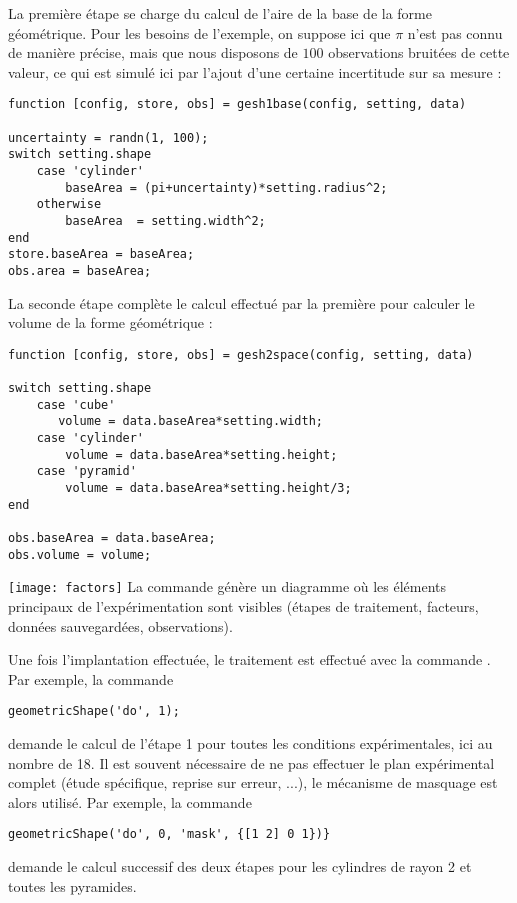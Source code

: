 La première étape se charge du calcul de l'aire de la base de la forme géométrique. Pour les besoins de l'exemple, on suppose ici que $\pi$ n'est pas connu de manière précise, mais que nous disposons de $100$ observations bruitées de cette valeur, ce qui est simulé ici par l'ajout d'une certaine incertitude sur sa mesure :
\begin{lstlisting}
function [config, store, obs] = gesh1base(config, setting, data)

uncertainty = randn(1, 100);
switch setting.shape
    case 'cylinder'
        baseArea = (pi+uncertainty)*setting.radius^2;
    otherwise
        baseArea  = setting.width^2;
end
store.baseArea = baseArea;
obs.area = baseArea;
\end{lstlisting}

La seconde étape complète le calcul effectué par la première pour calculer le volume de la forme géométrique :
\begin{lstlisting}
function [config, store, obs] = gesh2space(config, setting, data)

switch setting.shape
    case 'cube'
       volume = data.baseArea*setting.width;
    case 'cylinder'
        volume = data.baseArea*setting.height;
    case 'pyramid'
        volume = data.baseArea*setting.height/3;
end

obs.baseArea = data.baseArea;
obs.volume = volume;
\end{lstlisting}

\begin{marginfigure}
\texttt{[image: factors]}
La commande  génère un diagramme où les éléments principaux de l'expérimentation sont visibles (étapes de traitement, facteurs, données sauvegardées, observations).
\end{marginfigure}

Une fois l'implantation effectuée, le traitement est effectué avec la commande . Par exemple, la commande
\begin{lstlisting}
geometricShape('do', 1);
\end{lstlisting}
demande le calcul de l'étape 1 pour toutes les conditions expérimentales, ici au nombre de 18. Il est souvent nécessaire de ne pas effectuer le plan expérimental complet (étude spécifique, reprise sur erreur, ...), le mécanisme de masquage est alors utilisé. Par exemple, la commande
\begin{lstlisting}
geometricShape('do', 0, 'mask', {[1 2] 0 1})}
\end{lstlisting}
demande le calcul successif des deux étapes pour les cylindres de rayon 2 et toutes les pyramides.

